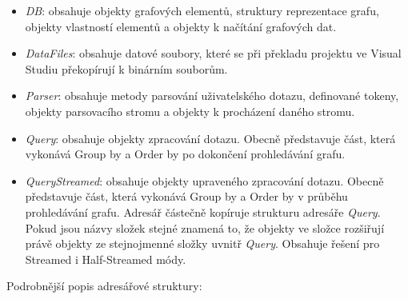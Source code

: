 \begin{itemize}

\item \textit{DB}: obsahuje objekty grafových elementů, struktury reprezentace grafu, objekty vlastností elementů a objekty k načítání grafových dat. 

\item \textit{DataFiles}: obsahuje datové soubory, které se při překladu projektu ve Visual Studiu překopírují k binárním souborům.

\item \textit{Parser}: obsahuje metody parsování uživatelského dotazu, definované tokeny, objekty parsovacího stromu a objekty k procházení daného stromu.

\item \textit{Query}: obsahuje objekty zpracování dotazu. 
Obecně představuje část, která vykonává Group by a Order by po dokončení prohledávání grafu. 

\item \textit{QueryStreamed}: obsahuje objekty upraveného zpracování dotazu. 
Obecně představuje část, která vykonává Group by a Order by v průběhu prohledávání grafu.
Adresář částečně kopíruje strukturu adresáře \textit{Query}.
Pokud jsou názvy složek stejné znamená to, že objekty ve složce rozšiřují právě objekty ze stejnojmenné složky uvnitř \textit{Query}. 
Obsahuje řešení pro Streamed i Half-Streamed módy.

\end{itemize}

Podrobnější popis adresářové struktury:

